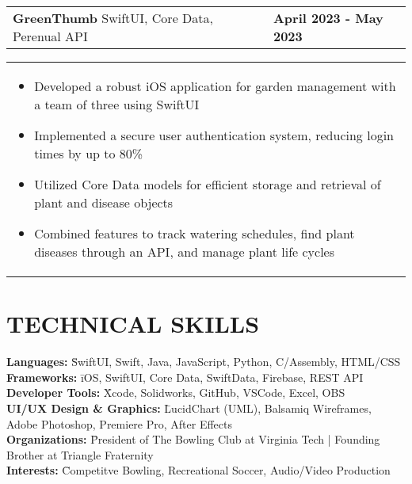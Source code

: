 \documentclass[10pt]{article}
\begin{document}
\vspace{-5pt}


\noindent \begin{tabularx}{\textwidth}{X >{\raggedleft\arraybackslash}X}
\textbf{GreenThumb} \textbar{} SwiftUI, Core Data, Perenual API & \textbf{April 2023 - May 2023} \\
\end{tabularx}

\vspace{-5pt}

\noindent \begin{tabularx}{\textwidth}{X}
\begin{itemize}[leftmargin=0.75cm, noitemsep, topsep=0pt, parsep=0pt, partopsep=0pt]
\item Developed a robust iOS application for garden management with a team of three using SwiftUI
\item Implemented a secure user authentication system, reducing login times by up to 80\%
\item Utilized Core Data models for efficient storage and retrieval of plant and disease objects
\item Combined features to track watering schedules, find plant diseases through an API, and manage plant life cycles
\end{itemize}
\end{tabularx}

\section*{TECHNICAL SKILLS}

\begin{tabbing}
\hspace{0.25cm} \= \textbf{Languages:} \= SwiftUI, Swift, Java, JavaScript, Python, C/Assembly, HTML/CSS \\
\> \textbf{Frameworks:} \= iOS, SwiftUI, Core Data, SwiftData, Firebase, REST API \\
\> \textbf{Developer Tools:} \= Xcode, Solidworks, GitHub, VSCode, Excel, OBS \\
\> \textbf{UI/UX Design \& Graphics:} \= LucidChart (UML), Balsamiq Wireframes, Adobe Photoshop, Premiere Pro, After Effects \\
\> \textbf{Organizations:} \= President of The Bowling Club at Virginia Tech | Founding Brother at Triangle Fraternity\\
\> \textbf{Interests:} \= Competitve Bowling, Recreational Soccer, Audio/Video Production

\end{tabbing}
\end{document}
